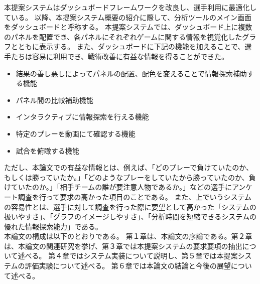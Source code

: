 \documentclass[sotsuron]{kuee}
\begin{document}
	本提案システムはダッシュボードフレームワークを改良し、選手利用に最適化している。
	以降、本提案システム概要の紹介に際して、分析ツールのメイン画面をダッシュボードと呼称する。
	本提案システムでは、ダッシュボード上に複数のパネルを配置でき、各パネルにそれぞれゲームに関する情報を視覚化したグラフとともに表示する。
	また、ダッシュボードに下記の機能を加えることで、選手たちは容易に利用でき、戦術改善に有益な情報を得ることができた。
		\begin{itemize}
			\item 結果の善し悪しによってパネルの配置、配色を変えることで情報探索補助する機能
			\item パネル間の比較補助機能
			\item インタラクティブに情報探索を行える機能
			\item 特定のプレーを動画にて確認する機能
			\item 試合を俯瞰する機能
		\end{itemize}
	ただし、本論文での有益な情報とは、例えば、「どのプレーで負けていたのか、もしくは勝っていたか。」「どのようなプレーをしていたから勝っていたのか、負けていたのか。」「相手チームの誰が要注意人物であるか。」などの選手にアンケート調査を行って要求の高かった項目のことである。
	また、上でいうシステムの容易性とは、選手に対して調査を行った際に要望として高かった「システムの扱いやすさ」、「グラフのイメージしやすさ」、「分析時間を短縮できるシステムの優れた情報探索能力」である。
	\\本論文の構成は以下のとおりである。
	第１章は、本論文の序論である。第２章は、本論文の関連研究を挙げ、第３章では本提案システムの要求要項の抽出について述べる。
	第４章ではシステム実装について説明し、第５章では本提案システムの評価実験について述べる。
	第６章では本論文の結論と今後の展望について述べる。

\end{document}
